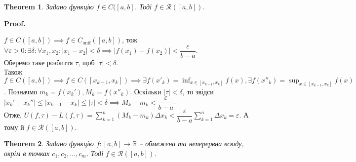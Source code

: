\documentclass[a4paper, 10pt]{article}
\makeatletter
\def\huge{\displaystyle}
\def\qed{$\blacksquare$}
\theoremstyle{theoremdd}
\newtheorem{theorem}{Theorem}[subsection]
\theoremstyle{theoremdd}
\theoremstyle{theoremdd}
\theoremstyle{theoremdd}
\theoremstyle{theoremdd}
\theoremstyle{theoremdd}
\theoremstyle{theoremdd}
\theoremstyle{theoremdd}
\theoremstyle{theoremdd}
\renewenvironment{proof}[1][Proof.\\]{\par
\pushQED{\hfill \qed}%
\normalfont \topsep6\p@\@plus6\p@\relax
\trivlist
\item\relax
{\bfseries
#1\@addpunct{.}}\hspace\labelsep\ignorespaces
}{%
\popQED\endtrivlist\@endpefalse
}
\makeatother
\begin{document}
\begin{theorem}
Задано функцію $f \in C([a,b]$. Тоді $f \in \mathcal{R}([a,b])$.
\end{theorem}

\begin{proof}
$f \in C([a,b]) \implies f \in C_{\text{unif}}([a,b])$, тож $\forall \varepsilon > 0: \exists \delta: \forall x_1,x_2: |x_1-x_2| < \delta \implies |f(x_1)-f(x_2)| < \dfrac{\varepsilon}{b-a}$.\\
Оберемо таке розбиття $\tau$, щоб $|\tau| < \delta$.\\
Також $f \in C([a,b]) \implies f \in C([x_{k-1},x_k]) \implies \huge \exists f(x'_k) = \inf_{x \in [x_{k-1},x_k]} f(x), \exists f(x''_k) = \sup_{x \in [x_{k-1},x_k]} f(x)$. Позначмо $m_k = f(x_k'), M_k = f(x''_k)$. Оскільки $|\tau| < \delta$, то звідси $|x_k'-x_k''| \leq |x_{k-1}-x_k| \leq |\tau| < \delta \implies M_k - m_k < \dfrac{\varepsilon}{b-a}$.\\
Отже, $U(f,\tau) - L(f,\tau) = \huge\sum_{k=1}^n (M_k-m_k)\Delta x_k < \dfrac{\varepsilon}{b-a} \sum_{k=1}^n \Delta x_k = \varepsilon$. А тому й $f \in \mathcal{R}([a,b])$.
\end{proof}

\begin{theorem}
Задано функцію $f \colon [a,b] \to \mathbb{R}$ -- обмежена та неперервна всюду, окрім в точках $c_1,c_2,\dots,c_m$. Тоді $f \in \mathcal{R}([a,b])$.
\end{theorem}
\end{document}
